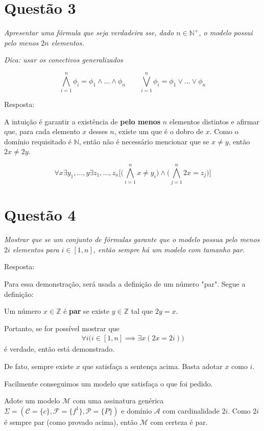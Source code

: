 \documentclass{article}
\begin{document}
\section*{Questão 3}
\textit{Apresentar uma fórmula que seja verdadeira sse, dado $n \in \mathbb{N}^+$, o modelo possui pelo menos $2n$ elementos.}

\textit{Dica: usar os conectivos generalizados}

\[\bigwedge_{i=1}^{n} \phi_i = \phi_1 \land \ldots \land \phi_n \qquad
\bigvee_{i=1}^{n} \phi_i = \phi_1 \lor \ldots \lor \phi_n\]

Resposta:

A intuição é garantir a existência de \textbf{pelo menos} $n$ elementos distintos e afirmar que, para cada elemento $x$ desses $n$, existe um que é o dobro de $x$. Como o domínio requisitado é $\mathbb{N}$, então não é necessário mencionar que se $x \neq y$, então $2x \neq 2y$.

\[ \forall x \exists y_1, \dots, y \exists z_1, \dots, z_n \Bigg[ \Big( \bigwedge_{i=1}^{n} x \neq y_i \Big) \wedge \Big( \bigwedge_{j=1}^{n} 2x = z_j  \Big) \Bigg] \]

\section*{Questão 4}
\textit{Mostrar que se um conjunto de fórmulas garante que o modelo possua pelo menos $2i$ elementos para $i \in [1, n]$, então sempre há um modelo com tamanho par.}

\medskip
Resposta:

Para essa demonstração, será usada a definição de um número "par". Segue a definição:

\bigskip
Um número $x \in \mathbb{Z}$ é \textbf{par} se existe $y \in \mathbb{Z}$ tal que $2y = x$.
\bigskip

Portanto, se for possível mostrar que
\begin{align*}
	\forall i \Big( i \in [1, n] \implies \exists x ( 2x = 2i ) \Big)
\end{align*}
é verdade, então está demonstrado.

De fato, sempre existe $x$ que satisfaça a sentença acima. Basta adotar $x$ como $i$.

Facilmente conseguimos um modelo que satisfaça o que foi pedido.

Adote um modelo $\mathcal{M}$ com uma assinatura genérica $\Sigma = (\mathcal{C} = \{ c \}, \mathcal{F} = \{ f^1 \}, \mathcal{P} = \{ P \})$ e domínio $\mathcal{A}$ com cardinalidade $2i$. Como $2i$ é sempre par (como provado acima), então $\mathcal{M}$ com certeza é par.
\end{document}
